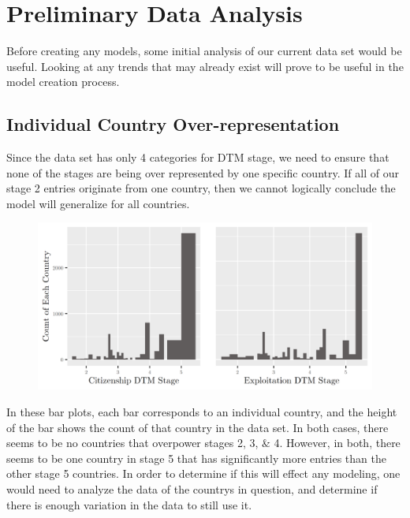 \documentclass{article} %
\begin{document}
\newpage
\section{Preliminary Data Analysis}

Before creating any models, some initial analysis of our current data set would be useful. Looking at any trends that may already exist will prove to be useful in the model creation process.



\subsection{Individual Country Over-representation}

Since the data set has only 4 categories for DTM stage, we need to ensure that none of the stages are being over represented by one specific country. If all of our stage 2 entries originate from one country, then we cannot logically conclude the model will generalize for all countries.

\FloatBarrier
\begin{figure}[H]
	\includegraphics[width = \textwidth]{CountryCountBarplot}
\end{figure}
\FloatBarrier

In these bar plots, each bar corresponds to an individual country, and the height of the bar shows the count of that country in the data set. In both cases, there seems to be no countries that overpower stages 2, 3, \& 4. However, in both, there seems to be one country in stage 5 that has significantly more entries than the other stage 5 countries. In order to determine if this will effect any modeling, one would need to analyze the data of the countrys in question, and determine if there is enough variation in the data to still use it. 
\end{document}
